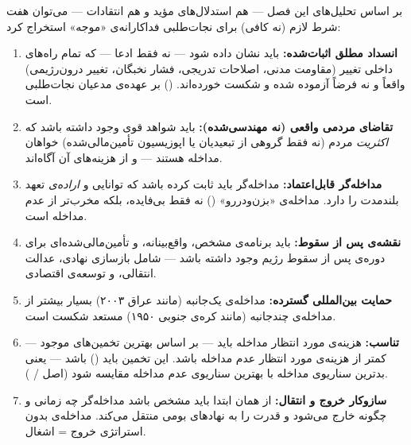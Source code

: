 بر اساس تحلیل‌های این فصل — هم استدلال‌های مؤید و هم انتقادات — می‌توان هفت شرط لازم (نه کافی) برای نجات‌طلبی فداکارانه‌ی «موجه» استخراج کرد:

\begin{tcolorbox}[defbox, title={هفت شرط لازم برای نجات‌طلبی فداکارانه‌ی موجه}]
\begin{enumerate}
\item \textbf{انسداد مطلق اثبات‌شده:} باید نشان داده شود — نه فقط ادعا — که تمام راه‌های داخلی تغییر (مقاومت مدنی، اصلاحات تدریجی، فشار نخبگان، تغییر درون‌رژیمی) واقعاً و نه فرضاً آزموده شده و شکست خورده‌اند.  () بر عهده‌ی مدعیان نجات‌طلبی است.

\item \textbf{تقاضای مردمی واقعی (نه مهندسی‌شده):} باید شواهد قوی وجود داشته باشد که \textit{اکثریت} مردم (نه فقط گروهی از تبعیدیان یا اپوزیسیون تأمین‌مالی‌شده) خواهان مداخله هستند — و از هزینه‌های آن آگاه‌اند.

\item \textbf{مداخله‌گر قابل‌اعتماد:} مداخله‌گر باید ثابت کرده باشد که توانایی و \textit{اراده‌ی} تعهد بلندمدت را دارد. مداخله‌ی «بزن‌و‌در‌رو» () نه فقط بی‌فایده، بلکه مخرب‌تر از عدم مداخله است.

\item \textbf{نقشه‌ی پس از سقوط:} باید برنامه‌ی مشخص، واقع‌بینانه، و تأمین‌مالی‌شده‌ای برای دوره‌ی پس از سقوط رژیم وجود داشته باشد — شامل بازسازی نهادی، عدالت انتقالی، و توسعه‌ی اقتصادی.

\item \textbf{حمایت بین‌المللی گسترده:} مداخله‌ی یک‌جانبه (مانند عراق ۲۰۰۳) بسیار بیشتر از مداخله‌ی چندجانبه (مانند کره‌ی جنوبی ۱۹۵۰) مستعد شکست است.

\item \textbf{تناسب:} هزینه‌ی مورد انتظار مداخله باید — بر اساس بهترین تخمین‌های موجود — کمتر از هزینه‌ی مورد انتظار عدم مداخله باشد. این تخمین باید  () باشد — یعنی بدترین سناریوی مداخله با بهترین سناریوی عدم مداخله مقایسه شود (اصل  / ).

\item \textbf{سازوکار خروج و انتقال:} از همان ابتدا باید مشخص باشد مداخله‌گر چه زمانی و چگونه خارج می‌شود و قدرت را به نهادهای بومی منتقل می‌کند. مداخله‌ی بدون استراتژی خروج = اشغال.
\end{enumerate}
\end{tcolorbox}

